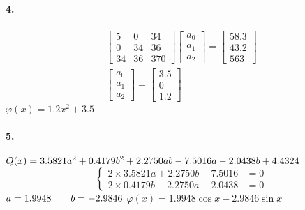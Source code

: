 \documentclass[UTF8]{ctexart}
\begin{document}
	\paragraph{4.}
	\begin{displaymath}
	\begin{gathered}
		\begin{bmatrix}
			5 & 0 & 34\\
			0 & 34 & 36\\
			34 & 36 & 370
		\end{bmatrix}
		\begin{bmatrix}
			a_0\\a_1\\a_2
		\end{bmatrix}
		=
		\begin{bmatrix}
			58.3\\43.2\\563
		\end{bmatrix}
		\\
		\begin{bmatrix}
			a_0\\a_1\\a_2
		\end{bmatrix}
		=
		\begin{bmatrix}
			3.5\\0\\1.2
		\end{bmatrix}
	\end{gathered}
	\end{displaymath}
	$\varphi(x)=1.2x^2+3.5$
	
	\paragraph{5.}
	$Q(x)=3.5821a^2+0.4179b^2+2.2750ab-7.5016a-2.0438b+4.4324\\$
	\begin{equation}
		\left\{
			\begin{array}{lr}
				2\times 3.5821a+2.2750b-7.5016&=0\\
				2\times 0.4179b+2.2750a-2.0438&=0
			\end{array}
		\right.
	\end{equation}
	$a=1.9948\qquad b=-2.9846\\$
	$\varphi(x)=1.9948\cos x-2.9846\sin x$
	
\end{document}
